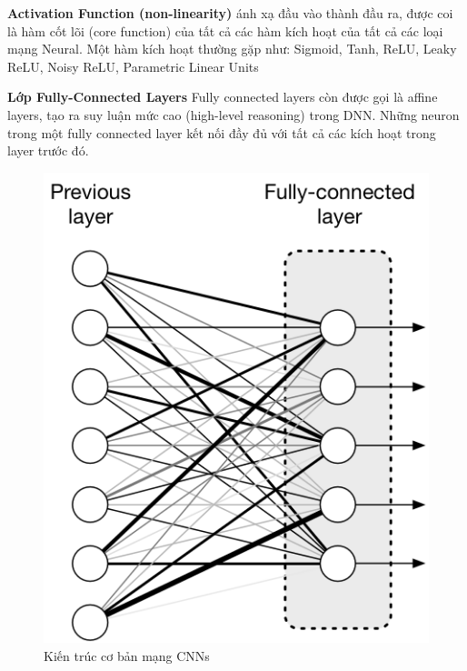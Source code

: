\documentclass{article}
\begin{document}

	\textbf{Activation Function (non-linearity)} ánh xạ đầu vào thành đầu ra, được coi là hàm cốt lõi (core function) của tất cả các hàm kích hoạt của tất cả các loại mạng Neural. Một hàm kích hoạt thường gặp như: Sigmoid, Tanh, ReLU, Leaky ReLU, Noisy ReLU, Parametric Linear Units

	\textbf{Lớp Fully-Connected Layers}
	Fully connected layers còn được gọi là affine layers, tạo ra suy luận mức cao (high-level reasoning) trong DNN. Những neuron trong một fully connected layer kết nối đầy đủ với tất cả các kích hoạt trong layer trước đó.
	
	\begin{figure}[H]
		\centering
		\includegraphics[width=0.5\linewidth]{images/FullyConnectedLayer.png}
		\caption{Kiến trúc cơ bản mạng CNNs}
		\label{fig:writing-thesis}
	\end{figure}
\end{document}

